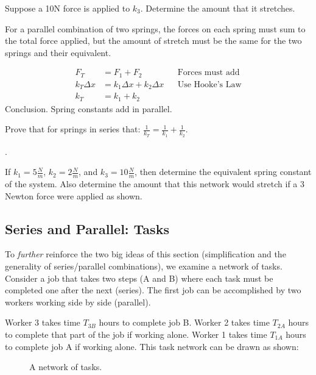 \begin{alevel}Suppose a 10N force is applied to $k_3$. Determine the amount that it stretches.\end{alevel}

For a parallel combination of two springs, the forces on each spring must sum to the total force applied, but the amount of stretch must be the same for the two springs and their equivalent.

\begin{align*}
F_T&=F_1+F_2&&\text{Forces must add}\\
k_T\Delta x &= k_1\Delta x+k_2\Delta x&&\text{Use Hooke's Law}\\
k_T &= k_1+k_2&&
\end{align*}
Conclusion. Spring constants add in parallel. 

\begin{clevel}Prove that for springs in series that: $\frac{1}{k_T}=\frac{1}{k_1}+\frac{1}{k_2}$.\end{clevel}.

\begin{blevel}If $k_1=5 \frac{N}{m}$, $k_2=2 \frac{N}{m}$, and $k_3=10 \frac{N}{m}$, then determine the equivalent spring constant of the system. Also determine the amount that this network would stretch if a 3 Newton force were applied as shown. \end{blevel}


\subsection{Series and Parallel: Tasks}
To \emph{further} reinforce the two big ideas of this section (simplification and the generality of series/parallel combinations), we examine a network of tasks. Consider a job that takes two steps (A and B) where each task must be completed one after the next (series). The first job can be accomplished by two workers working side by side (parallel). \par
Worker 3 takes time $T_{3B}$ hours to complete job B. Worker 2 takes time $T_{2A}$ hours to complete that part of the job if working alone. Worker 1 takes time $T_{1A}$ hours to complete job A if working alone. This task network can be drawn as shown:

\begin{figure}[H]
\begin{center}
\label{F3:JOBS}
\caption{A network of tasks.}
\end{center}
\end{figure}

